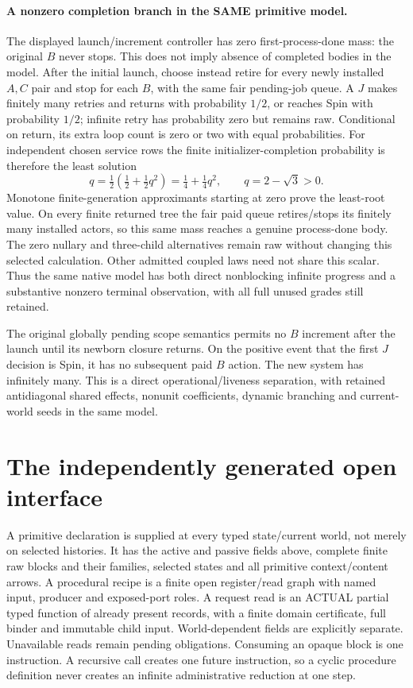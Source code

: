 \documentclass[11pt]{article}\usepackage{amsmath,amssymb,amsthm}
\begin{document}
\paragraph{A nonzero completion branch in the SAME primitive model.}
The displayed launch/increment controller has zero first-process-done mass: the original $B$ never stops. This does not imply absence of completed bodies in the model. After the initial launch, choose instead retire for every newly installed $A,C$ pair and stop for each $B$, with the same fair pending-job queue. A $J$ makes finitely many retries and returns with probability $1/2$, or reaches Spin with probability $1/2$; infinite retry has probability zero but remains raw. Conditional on return, its extra loop count is zero or two with equal probabilities. For independent chosen service rows the finite initializer-completion probability is therefore the least solution
\[
 q=\tfrac12(\tfrac12+\tfrac12q^2)=\tfrac14+\tfrac14q^2,
 \qquad q=2-\sqrt3>0.
\]
Monotone finite-generation approximants starting at zero prove the least-root value. On every finite returned tree the fair paid queue retires/stops its finitely many installed actors, so this same mass reaches a genuine process-done body. The zero nullary and three-child alternatives remain raw without changing this selected calculation. Other admitted coupled laws need not share this scalar. Thus the same native model has both direct nonblocking infinite progress and a substantive nonzero terminal observation, with all full unused grades still retained.

The original globally pending scope semantics permits no $B$ increment after the launch until its newborn closure returns. On the positive event that the first $J$ decision is Spin, it has no subsequent paid $B$ action. The new system has infinitely many. This is a direct operational/liveness separation, with retained antidiagonal shared effects, nonunit coefficients, dynamic branching and current-world seeds in the same model.

\section{The independently generated open interface}
A primitive declaration is supplied at every typed state/current world, not merely on selected histories. It has the active and passive fields above, complete finite raw blocks and their families, selected states and all primitive context/content arrows. A procedural recipe is a finite open register/read graph with named input, producer and exposed-port roles. A request read is an ACTUAL partial typed function of already present records, with a finite domain certificate, full binder and immutable child input. World-dependent fields are explicitly separate. Unavailable reads remain pending obligations. Consuming an opaque block is one instruction. A recursive call creates one future instruction, so a cyclic procedure definition never creates an infinite administrative reduction at one step.
\end{document}
